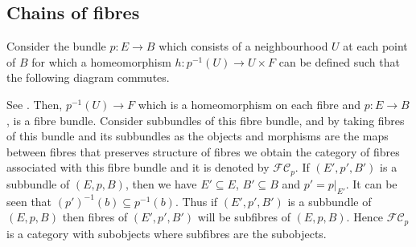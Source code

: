 \documentclass{amsart}
\theoremstyle{plain}
\begin{document}
\subsection{Chains of fibres}
Consider the bundle $p: E \rightarrow B$ which consists of a neighbourhood $U$ at each point of $B$ for which a homeomorphism $h: p^{-1}(U) \rightarrow U \times F$ can be defined such that the following diagram commutes.
\begin{center}  
\end{center}
See \cite{Dale}. Then,  $p^{-1}(U) \rightarrow F $ which is a homeomorphism on each fibre and $p: E \rightarrow B$, is a  fibre bundle. Consider subbundles of this fibre bundle, and by taking fibres of this bundle and its subbundles as the objects and morphisms are the maps between fibres that preserves structure of fibres we obtain the category of fibres  associated with this fibre bundle and it is denoted by $\mathcal{FC}_p $. If $(E', p', B')$ is a subbundle of $(E, p, B)$, then we have $E' \subseteq E$, $B' \subseteq B$ and $p' = p|_{E'} $. It can be seen that $(p')^{-1}(b) \subseteq p^{-1}(b) $. Thus if $(E', p', B')$ is a subbundle of $(E, p, B)$ then fibres of $(E', p', B')$ will be subfibres of $(E, p, B)$. Hence $\mathcal{FC}_p $ is a category with subobjects where subfibres are the subobjects.
\end{document}
